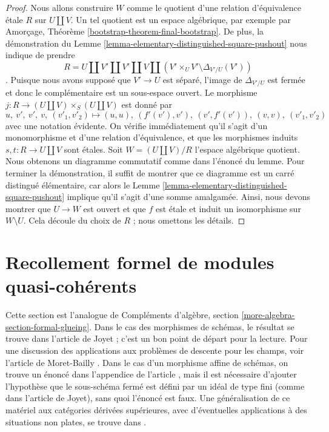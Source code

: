 \begin{proof}
Nous allons construire $W$ comme le quotient d'une relation d'équivalence \'etale $R$ sur $U \amalg V$. Un tel quotient est un espace algébrique, par exemple par Amorçage, Théorème \ref{bootstrap-theorem-final-bootstrap}.
De plus, la démonstration du Lemme \ref{lemma-elementary-distinguished-square-pushout} nous indique de prendre $$
R = U \amalg V' \amalg V' \amalg V \amalg
(V' \times_U V' \setminus \Delta_{V'/U}(V'))
$$.
Puisque nous avons supposé que $V' \to U$ est séparé, l'image de $\Delta_{V'/U}$ est fermée et donc le complémentaire est un sous-espace ouvert. Le morphisme $j : R \to (U \amalg V) \times_S (U \amalg V)$ est donné par $$
u,\ v',\ v',\ v,\ (v'_1, v'_2) \mapsto
(u, u),\ (f'(v'), v'),\ (v', f'(v')),\ (v, v),\ (v'_1, v'_2)
$$ avec une notation évidente. On vérifie immédiatement qu'il s'agit d'un monomorphisme et d'une relation d'équivalence, et que les morphismes induits $s, t : R \to U \amalg V$ sont \'etales. Soit $W = (U \amalg V)/R$ l'espace algébrique quotient.
Nous obtenons un diagramme commutatif comme dans l'énoncé du lemme.
Pour terminer la démonstration, il suffit de montrer que ce diagramme est un carré distingué élémentaire, car alors le
Lemme \ref{lemma-elementary-distinguished-square-pushout} implique qu'il s'agit d'une somme amalgamée.  
Ainsi, nous devons montrer que $U \to W$ est ouvert et que  
$f$ est \'etale et induit un isomorphisme sur $W \setminus U$.  
Cela découle du choix de $R$ ; nous omettons les détails.  
\end{proof}






\section{Recollement formel de modules quasi-cohérents}
\label{section-formal-glueing}

\noindent
Cette section est l'analogue de
Compléments d'algèbre, section \ref{more-algebra-section-formal-glueing}.
Dans le cas des morphismes de schémas, le résultat se trouve dans
l'article de Joyet \cite{Joyet} ; c'est un bon point de départ pour la lecture.
Pour une discussion des applications aux problèmes de descente pour les champs, voir
l'article de Moret-Bailly \cite{MB}. Dans le cas d'un morphisme affine de schémas, on trouve un énoncé dans l'appendice de l'article
\cite{Ferrand-Raynaud}, mais il est nécessaire d'ajouter l'hypothèse
que le sous-schéma fermé est défini par un idéal de type fini (comme dans l'article de Joyet), sans quoi l'énoncé est faux.
Une généralisation de ce matériel aux catégories dérivées supérieures, avec d'éventuelles applications à des situations non plates,
se trouve dans \cite[section 5]{Bhatt-Algebraize}.

